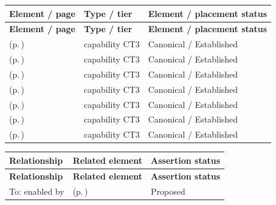 \begingroup\small\setlength{\TableWidth}{\dimexpr\linewidth-6\tabcolsep-4\arrayrulewidth\relax}
\begin{longtable}{|>{\raggedright\arraybackslash}p{0.52\TableWidth}|>{\raggedright\arraybackslash}p{0.2\TableWidth}|>{\raggedright\arraybackslash}p{0.28\TableWidth}|}
\hline\rowcolor{TableHead}\textbf{Element / page} & \textbf{Type / tier} & \textbf{Element / placement status}\\\hline\endfirsthead
\hline\rowcolor{TableHead}\textbf{Element / page} & \textbf{Type / tier} & \textbf{Element / placement status}\\\hline\endhead
\hline\endfoot
\nameref{cap:bc-information-model-discovery} (p.\,\pageref{cap:bc-information-model-discovery}) & capability CT3 & Canonical / Established\\\hline
\nameref{cap:bc-information-model-adoption} (p.\,\pageref{cap:bc-information-model-adoption}) & capability CT3 & Canonical / Established\\\hline
\nameref{cap:bc-information-model-education} (p.\,\pageref{cap:bc-information-model-education}) & capability CT3 & Canonical / Established\\\hline
\nameref{cap:bc-information-model-compliance} (p.\,\pageref{cap:bc-information-model-compliance}) & capability CT3 & Canonical / Established\\\hline
\nameref{cap:bc-information-model-governance-oversight} (p.\,\pageref{cap:bc-information-model-governance-oversight}) & capability CT3 & Canonical / Established\\\hline
\nameref{cap:bc-standards-adoption} (p.\,\pageref{cap:bc-standards-adoption}) & capability CT3 & Canonical / Established\\\hline
\nameref{cap:bc-standards-impact-identification} (p.\,\pageref{cap:bc-standards-impact-identification}) & capability CT3 & Canonical / Established\\\hline
\end{longtable}\endgroup

\begingroup\small\setlength{\TableWidth}{\dimexpr\linewidth-6\tabcolsep-4\arrayrulewidth\relax}
\begin{longtable}{|>{\raggedright\arraybackslash}p{0.27\TableWidth}|>{\raggedright\arraybackslash}p{0.48\TableWidth}|>{\raggedright\arraybackslash}p{0.25\TableWidth}|}
\hline\rowcolor{TableHead}\textbf{Relationship} & \textbf{Related element} & \textbf{Assertion status}\\\hline\endfirsthead
\hline\rowcolor{TableHead}\textbf{Relationship} & \textbf{Related element} & \textbf{Assertion status}\\\hline\endhead
\hline\endfoot
To: enabled by & \nameref{cap:bec-information-design-governance} (p.\,\pageref{cap:bec-information-design-governance}) & Proposed\\\hline
\end{longtable}\endgroup

